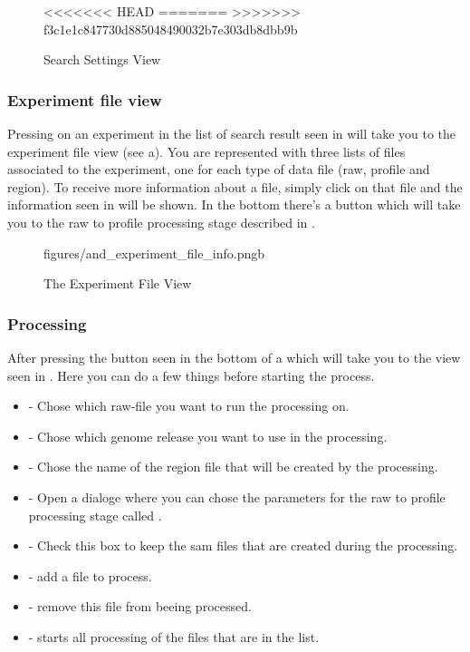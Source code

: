 \begin{figure}[ht]
<<<<<<< HEAD
=======
>>>>>>> f3c1e1c847730d885048490032b7e303db8dbb9b
\caption{Search Settings View}
\label{fig:and_search_settings_man}
\end{figure}
\FloatBarrier


\subsubsection{Experiment file view}\label{sec:and_experiment_file}
Pressing on an experiment in the list of search result seen in  will take you to the experiment file view (see a). You are represented with three lists of files associated to the experiment, one for each type of data file (raw, profile and region). To receive more information about a file, simply click on that file and the information seen in  will be shown. In the bottom there's a button  which will take you to the raw to profile processing stage described in .

\begin{figure}[h]
		{figures/and_experiment_file_info.png}{b}
\caption{The Experiment File View}
\label{fig:and_experiment_man}
\end{figure}
\FloatBarrier


\subsubsection{Processing}\label{sec:and_processing}
After pressing the  button seen in the bottom of a which will take you to the view seen in . Here you can do a few things before starting the process.
\begin{itemize}
\item {} - Chose which raw-file you want to run the processing on.
\item {} - Chose which genome release you want to use in the processing.
\item {} - Chose the name of the region file that will be created by the processing.
\item {} - Open a dialoge where you can chose the parameters for the raw to profile processing stage called .
\item {} - Check this box to keep the sam files that are created during the processing.
\item {} - add a file to process.
\item {} - remove this file from beeing processed.
\item {} - starts all processing of the files that are in the list.
\end{itemize}


